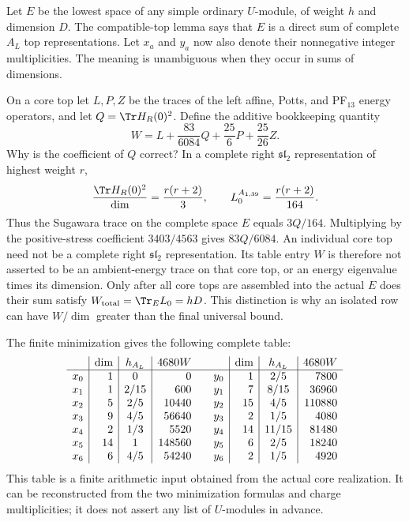 Let $E$ be the lowest space of any simple ordinary $U$-module, of
weight $h$ and dimension $D$. The compatible-top lemma says that
$E$ is a direct sum of complete $A_L$ top representations. Let $x_a$
and $y_a$ now also denote their nonnegative integer multiplicities.
The meaning is unambiguous when they occur in sums of dimensions.

On a core top let $L,P,Z$ be the traces of the left affine, Potts,
and PF$_{13}$ energy operators, and let $Q=\Tr H_R(0)^2$.
Define the additive bookkeeping quantity
\begin{equation}\label{eq:c-top-W}
 W=L+\frac{83}{6084}Q+\frac{25}{6}P+\frac{25}{26}Z.
\end{equation}
Why is the coefficient of $Q$ correct? In a complete right
$\mathfrak{sl}_2$ representation of highest weight $r$,
\[
 \frac{\Tr H_R(0)^2}{\dim}=\frac{r(r+2)}3,
 \qquad L^{A_{1,39}}_0=\frac{r(r+2)}{164}.
\]
Thus the Sugawara trace on the complete space $E$ equals $3Q/164$.
Multiplying by the
positive-stress coefficient $3403/4563$ gives $83Q/6084$.
An individual core top need not be a complete right
$\mathfrak{sl}_2$ representation. Its table entry $W$ is therefore
not asserted to be an ambient-energy trace on that core top, or an
energy eigenvalue times its dimension. Only after all core tops are
assembled into the actual $E$ does their sum satisfy
$W_{\rm total}=\Tr_E L_0=hD$. This distinction is why an isolated
row can have $W/\dim$ greater than the final universal bound.

The finite minimization gives the following complete table:
\[
\begin{array}{c|r|c|r@{\qquad}c|r|c|r}
 &\dim&h_{A_L}&4680W&&\dim&h_{A_L}&4680W\\\hline
 x_0&1&0&0&y_0&1&2/5&7800\\
 x_1&1&2/15&600&y_1&7&8/15&36960\\
 x_2&5&2/5&10440&y_2&15&4/5&110880\\
 x_3&9&4/5&56640&y_3&2&1/5&4080\\
 x_4&2&1/3&5520&y_4&14&11/15&81480\\
 x_5&14&1&148560&y_5&6&2/5&18240\\
 x_6&6&4/5&54240&y_6&2&1/5&4920
\end{array}
\]
This table is a finite arithmetic input obtained from the actual
core realization. It can be reconstructed from the two minimization
formulas and charge multiplicities; it does not assert any list of
$U$-modules in advance.

